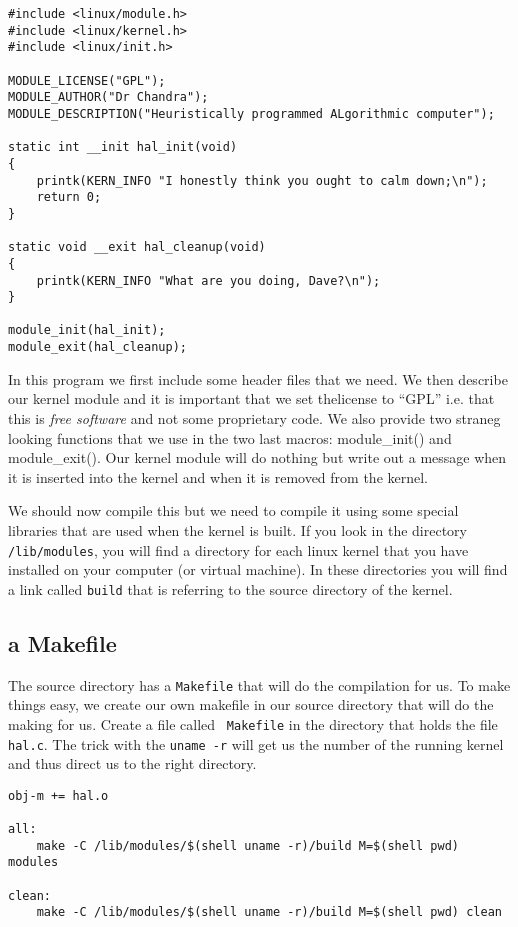 \documentclass[a4paper,11pt]{article}
\begin{document}
\begin{lstlisting}
#include <linux/module.h>   
#include <linux/kernel.h>   
#include <linux/init.h>

MODULE_LICENSE("GPL");
MODULE_AUTHOR("Dr Chandra");
MODULE_DESCRIPTION("Heuristically programmed ALgorithmic computer");

static int __init hal_init(void)
{
    printk(KERN_INFO "I honestly think you ought to calm down;\n");
    return 0;  
}

static void __exit hal_cleanup(void)
{
    printk(KERN_INFO "What are you doing, Dave?\n");
}

module_init(hal_init);
module_exit(hal_cleanup);
\end{lstlisting}

In this program we first include some header files that we need. We
then describe our kernel module and it is important that we set
thelicense to ``GPL'' i.e. that this is {\em free software} and not
some proprietary code. We also provide two straneg looking functions
that we use in the two last macros: module\_init() and
module\_exit(). Our kernel module will do nothing but write out a
message when it is inserted into the kernel and when it is removed
from the kernel.

We should now compile this but we need to compile it using some
special libraries that are used when the kernel is built. If you look
in the directory {\tt /lib/modules}, you will find a directory for
each linux kernel that you have installed on your computer (or virtual
machine). In these directories you will find a link called {\tt build}
that is referring to the source directory of the kernel.

\subsection{a Makefile}

The source directory has a {\tt Makefile} that will do the compilation
for us. To make things easy, we create our own makefile in our source
directory that will do the making for us. Create a file called {\tt
  Makefile} in the directory that holds the file {\tt hal.c}. The
trick with the {\tt uname -r} will get us the number of the running
kernel and thus direct us to the right directory.

\begin{lstlisting}
obj-m += hal.o

all:
	make -C /lib/modules/$(shell uname -r)/build M=$(shell pwd) modules

clean:
	make -C /lib/modules/$(shell uname -r)/build M=$(shell pwd) clean
\end{lstlisting}
\end{document}
